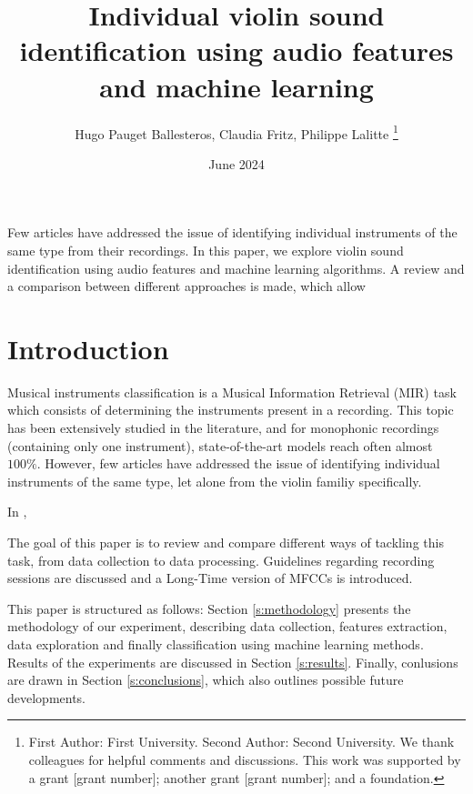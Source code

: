 \documentclass[letterpaper,11pt,leqno]{article}
\begin{document}
\title{Individual violin sound identification using audio features and machine learning}

\author{Hugo Pauget Ballesteros, Claudia Fritz, Philippe Lalitte
%
\thanks{First Author: First University. Second Author: Second University. We thank colleagues for helpful comments and discussions. This work was supported by a grant [grant number]; another grant [grant number]; and a foundation.}}

\date{June 2024}   

\begin{titlepage}
\maketitle

Few articles have addressed the issue of identifying individual instruments of the same type from their recordings. In this paper, we explore violin sound identification using audio features and machine learning algorithms. A review and a comparison between different approaches is made, which allow

\end{titlepage}

\section{Introduction}\label{s:introduction}
 
Musical instruments classification is a Musical Information Retrieval (MIR) task which consists of determining the instruments present in a recording. This topic has been extensively studied in the literature, and for monophonic recordings (containing only one instrument), state-of-the-art models reach often almost $100\%$. However, few articles have addressed the issue of identifying individual instruments of the same type, let alone from the violin familiy specifically.

In \cite{lukasikLongTermCepstral2010b}, 

The goal of this paper is to review and compare different ways of tackling this task, from data collection to data processing. Guidelines regarding recording sessions are discussed and a Long-Time version of MFCCs is introduced.

This paper is structured as follows: Section \ref{s:methodology} presents the methodology of our experiment, describing data collection, features extraction, data exploration and finally classification using machine learning methods. Results of the experiments are discussed in Section \ref{s:results}. Finally, conlusions are drawn in Section \ref*{s:conclusions}, which also outlines possible future developments. 
\end{document}
